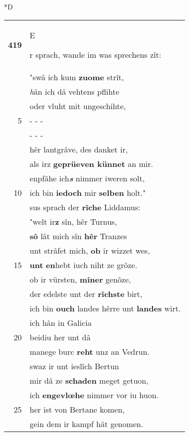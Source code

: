 \documentclass[8pt,a4paper,notitlepage]{article}
\begin{document}
\begin{table}[ht]
\begin{minipage}[t]{0.5\linewidth}
\small
\begin{center}*D
\end{center}
\begin{tabular}{rl}
\textbf{419} & \begin{large}E\end{large}r sprach, wande im was sprechens zît:\\ 
 & "swâ ich kum \textbf{zuome} strît,\\ 
 & \textit{h}ân ich dâ vehtens pflihte\\ 
 & oder vluht mit ungeschihte,\\ 
5 & \multicolumn{1}{l}{ - - - }\\ 
 & \multicolumn{1}{l}{ - - - }\\ 
 & hêr lantgrâve, des danket ir,\\ 
 & als irz \textbf{geprüeven künnet} an mir.\\ 
 & enpfâhe ich\textit{\textbf{s}} nimmer iweren solt,\\ 
10 & ich bin \textbf{iedoch} mir \textbf{selben} holt."\\ 
 & sus sprach der \textbf{rîche} Liddamus:\\ 
 & "welt ir\textbf{z} sîn, hêr Turnus,\\ 
 & \textbf{sô} lât mich sîn \textbf{hêr} Tranzes\\ 
 & unt strâfet mich, \textbf{ob} ir wizzet wes,\\ 
15 & \textbf{unt} \textbf{en}hebt iuch niht ze grôze.\\ 
 & ob ir vürsten, \textbf{mîner} genôze,\\ 
 & der edelste unt der \textbf{rîchste} birt,\\ 
 & ich bin \textbf{ouch} landes hêrre unt \textbf{landes} wirt.\\ 
 & ich hân in Galicia\\ 
20 & beidiu her unt dâ\\ 
 & manege burc \textbf{reht} unz an Vedrun.\\ 
 & swaz ir unt ieslîch Bertun\\ 
 & mir dâ ze \textbf{schaden} meget getuon,\\ 
 & ich \textbf{en}\textbf{gevlœhe} nimmer vor iu huon.\\ 
25 & her ist von Bertane komen,\\ 
 & gein dem ir kampf hât genomen.\\ 

\end{tabular}
\end{minipage}
\end{table}
\end{document}
